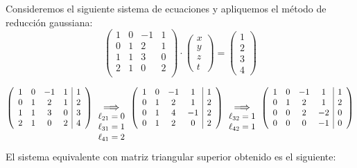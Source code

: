             \begin{ejem}
              Consideremos el siguiente sistema de ecuaciones y apliquemos el método de reducción gaussiana:
              $$\begin{pmatrix}
              1&0&-1&1\\
              0&1&2 &1\\
              1&1&3&0\\
              2&1&0&2\\
              \end{pmatrix}
              \cdot
              \begin{pmatrix}
              x\\
              y\\
              z\\
              t
              \end{pmatrix}
              =\begin{pmatrix}
              1\\
              2\\
              3\\
              4
              \end{pmatrix}$$
              
              $$\left(\begin{array}{cccc|c}
              1&0&-1&1&1\\
              0&1&2 &1&2\\
              1&1&3&0&3\\
              2&1&0&2&4
              \end{array}\right)
              \underset{\begin{array}{c}
                   \ell_{21}=0  \\
                   \ell_{31}=1 \\
                   \ell_{41}=2
              \end{array}}{\mathlarger{\Longrightarrow}}
              \left(\begin{array}{cccc|c}
              1&0&-1&1&1\\
              0&1&2 &1&2\\
              0&1&4&-1&2\\
              0&1&2&0&2
              \end{array}\right)
              \underset{\begin{array}{c}
                   \ell_{32}=1 \\
                   \ell_{42}=1
              \end{array}}{\mathlarger{\Longrightarrow}}
              \left(\begin{array}{cccc|c}
              1&0&-1&1&1\\
              0&1&2 &1&2\\
              0&0&2&-2&0\\
              0&0&0&-1&0
              \end{array}\right)
              $$
              El sistema equivalente con matriz triangular superior obtenido es el siguiente:
              

\end{ejem}
